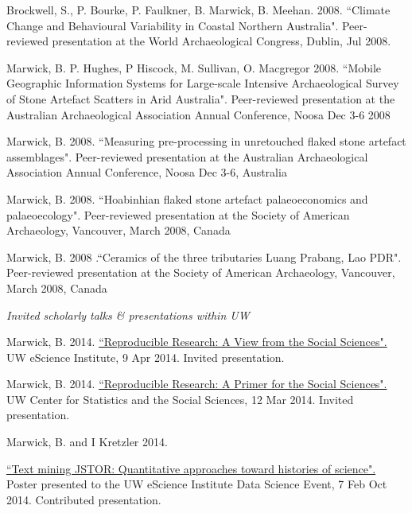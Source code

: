 {\ind Brockwell, S., P. Bourke, P. Faulkner, B. Marwick, B. Meehan. 2008. ``Climate Change and Behavioural Variability in Coastal Northern Australia". Peer-reviewed presentation at the World Archaeological Congress, Dublin,  Jul 2008. 

\ind Marwick, B. P. Hughes, P Hiscock, M. Sullivan, O. Macgregor 2008. ``Mobile Geographic Information Systems for Large-scale Intensive Archaeological Survey of Stone Artefact Scatters in Arid Australia". Peer-reviewed presentation at the Australian Archaeological Association Annual Conference, Noosa Dec 3-6 2008

\ind Marwick, B. 2008. ``Measuring pre-processing in unretouched flaked stone artefact assemblages". Peer-reviewed presentation at the Australian Archaeological Association Annual Conference, Noosa Dec 3-6, Australia

\ind Marwick, B. 2008. ``Hoabinhian flaked stone artefact palaeoeconomics and palaeoecology". Peer-reviewed presentation at the Society of American Archaeology, Vancouver, March 2008, Canada

\ind Marwick, B. 2008 .``Ceramics of the three tributaries Luang Prabang, Lao PDR". Peer-reviewed presentation at the  Society of American Archaeology, Vancouver, March 2008, Canada

 \bigskip
 
 

\noindent\emph{Invited scholarly talks \& presentations within UW \vspace{0.01in}}

\medskip

\ind Marwick, B. 2014. {\href{https://github.com/benmarwick/UW-eScience-reproducibility-social-sciences}{``Reproducible Research: A View from the Social Sciences".}}  UW eScience Institute, 9 Apr 2014. Invited presentation.

\ind Marwick, B. 2014. {\href{https://github.com/benmarwick/CSSS-Primer-Reproducible-Research}{``Reproducible Research: A Primer for the Social Sciences".}}  UW Center for Statistics and the Social Sciences, 12 Mar 2014. Invited presentation.

\ind Marwick, B. and I Kretzler 2014. {\href{https://github.com/benmarwick/Data-Science-at-UW-Poster}{``Text mining JSTOR: Quantitative approaches toward histories of science".} Poster presented to the UW eScience Institute Data Science Event, 7 Feb Oct 2014. Contributed presentation.

}}
